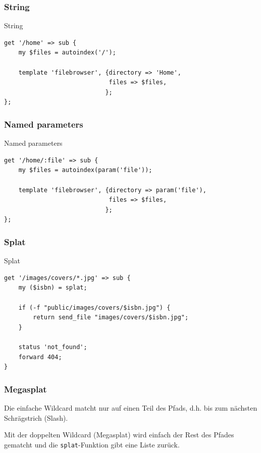 \subsubsection{String}
\begin{frame}[fragile]{String}
\begin{lstlisting}
get '/home' => sub {
    my $files = autoindex('/');

    template 'filebrowser', {directory => 'Home',
                             files => $files,
                            };
};
\end{lstlisting}
\end{frame}

\subsubsection{Named parameters}
\begin{frame}[fragile]{Named parameters}
\begin{lstlisting}
get '/home/:file' => sub {
    my $files = autoindex(param('file'));

    template 'filebrowser', {directory => param('file'),
                             files => $files,
                            };
};
\end{lstlisting}
\end{frame}

\subsubsection{Splat}
\begin{frame}[fragile]{Splat}
\begin{lstlisting}
get '/images/covers/*.jpg' => sub {
    my ($isbn) = splat;

    if (-f "public/images/covers/$isbn.jpg") {
        return send_file "images/covers/$isbn.jpg";
    }

    status 'not_found';
    forward 404;
}
\end{lstlisting}
\end{frame}

\subsubsection{Megasplat}
Die einfache Wildcard matcht nur auf einen Teil des Pfads,
d.h. bis zum nächsten Schrägstrich (Slash).

Mit der doppelten Wildcard (Megasplat) wird einfach der 
Rest des Pfades gematcht und die \verb|splat|-Funktion
gibt eine Liste zurück.

